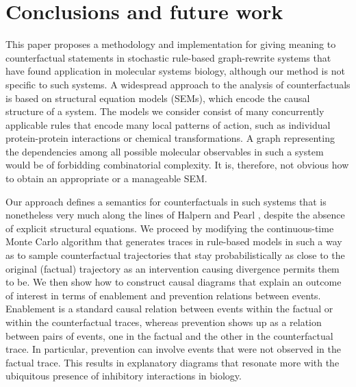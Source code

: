 
\section*{Conclusions and future work}

This paper proposes a methodology and implementation for giving
meaning to counterfactual statements in stochastic rule-based
graph-rewrite systems that have found application in molecular systems
biology, although our method is not specific to such systems. A
widespread approach to the analysis of counterfactuals is based on
structural equation models (SEMs), which encode the causal structure
of a system. The models we consider consist of many concurrently
applicable rules that encode many local patterns of action, such as
individual protein-protein interactions or chemical transformations. A
graph representing the dependencies among all possible molecular
observables in such a system would be of forbidding combinatorial
complexity. It is, therefore, not obvious how to obtain an appropriate
or a manageable SEM.

Our approach defines a semantics for counterfactuals in such systems
that is nonetheless very much along the lines of Halpern and Pearl
\cite{pearl2009causality,halpern2016actual}, despite the absence of
explicit structural equations. We proceed by modifying the
continuous-time Monte Carlo algorithm that generates traces in
rule-based models in such a way as to sample counterfactual
trajectories that stay probabilistically as close to the original
(factual) trajectory as an intervention causing divergence permits
them to be. We then show how to construct causal diagrams that explain
an outcome of interest in terms of enablement and prevention relations
between events. Enablement is a standard causal relation between
events within the factual or within the counterfactual traces, whereas
prevention shows up as a relation between pairs of events, one in the
factual and the other in the counterfactual trace. In particular,
prevention can involve events that were not observed in the factual
trace. This results in explanatory diagrams that resonate more with
the ubiquitous presence of inhibitory interactions in biology.

